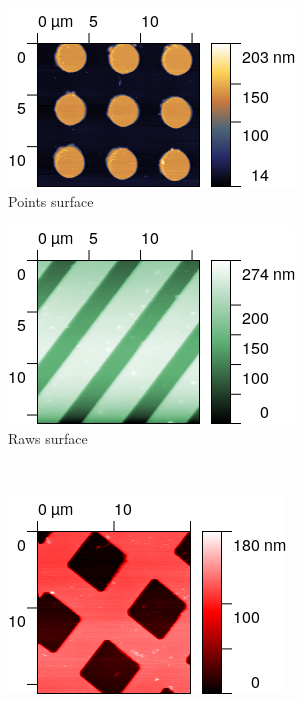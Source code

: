 \documentclass[11pt,a4paper]{article}
\begin{document}
\begin{figure}[H]
\centering
\begin{subfigure}[b]{0.45\textwidth}
\includegraphics[width=\textwidth]{sm_points}
\caption{Points surface}
\label{fig:sm_points}
\end{subfigure}
\begin{subfigure}[b]{0.45\textwidth}
\includegraphics[width=\textwidth]{sm_raws}
\caption{Raws surface}
\label{fig:sm_raws}
\end{subfigure}\\\vspace{.2cm}
\begin{subfigure}[b]{0.45\textwidth}
\includegraphics[width=\textwidth]{sm_squares}

\end{subfigure}
\end{figure}
\end{document}
